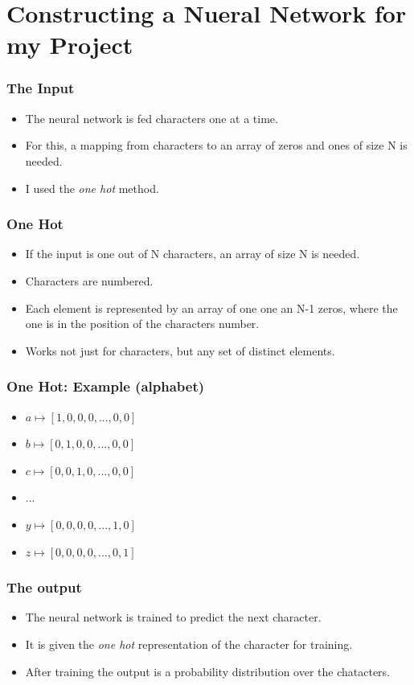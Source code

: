 \documentclass[12]{beamer}
\begin{document}
\section{Constructing a Nueral Network for my Project}
\begin{frame}
\frametitle{The Input}
\begin{itemize}
\item<1-> The neural network is fed characters one at a time.
\item<1-> For this, a mapping from characters to an array of zeros and ones of size N is needed.
\item<1-> I used the \textit{one hot} method.
\end{itemize}
\end{frame}

\begin{frame}
\frametitle{One Hot}
\begin{itemize}
\item<1-> If the input is one out of N characters, an array of size N is needed.
\item<1-> Characters are numbered.
\item<1-> Each element is represented by an array of one one an N-1 zeros, where the one is in the position of the characters number.
\item<1-> Works not just for characters, but any set of distinct elements.
\end{itemize}
\end{frame}

\begin{frame}
\frametitle{One Hot: Example (alphabet)}
\begin{itemize}
\item<1-> $a \longmapsto [1,0,0,0,...,0,0]$
\item<1-> $b \longmapsto [0,1,0,0,...,0,0]$
\item<1-> $c \longmapsto [0,0,1,0,...,0,0]$
\item<1-> $...$
\item<1-> $y \longmapsto [0,0,0,0,...,1,0]$
\item<1-> $z \longmapsto [0,0,0,0,...,0,1]$
\end{itemize}
\end{frame}

\begin{frame}
\frametitle{The output}
\begin{itemize}
\item<1-> The neural network is trained to predict the next character.
\item<1-> It is given the \textit{one hot} representation of the character for training.
\item<1-> After training the output is a probability distribution over the chatacters.
\end{itemize}
\end{frame}
\end{document}
